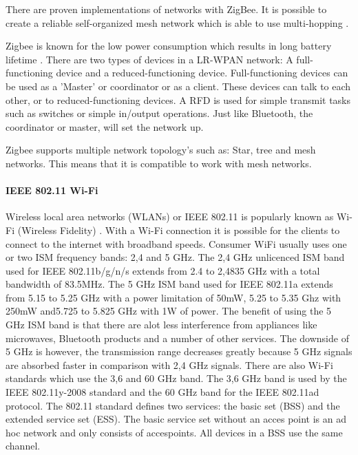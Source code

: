 \documentclass[10pt,a4paper]{article}
\begin{document}
There are proven implementations of networks with ZigBee. It is possible to create a reliable self-organized mesh network which is able to use multi-hopping \cite{comparitivestudywirelessprotocols}.

Zigbee is known for the low power consumption which results in long battery lifetime \cite{performanceevaluationlowratewirelesspan}. There are two types of devices in a LR-WPAN network: A full-functioning device and a reduced-functioning device. Full-functioning devices can be used as a 'Master' or coordinator or as a client. These devices can talk to each other, or to reduced-functioning devices. A RFD is used for simple transmit tasks such as switches or simple in/output operations. Just like Bluetooth, the coordinator or master, will set the network up.

Zigbee supports multiple network topology's such as: Star, tree and mesh networks. This means that it is compatible to work with mesh networks. \cite{zigbeewiki}


\paragraph{IEEE 802.11 Wi-Fi}
Wireless local area networks (WLANs) or IEEE 802.11 is popularly known as Wi-Fi (Wireless Fidelity) \cite{wirelessmeshnetworksopportunitiesandchallenges}. With a Wi-Fi connection it is possible for the clients to connect to the internet with broadband speeds. Consumer WiFi usually uses one or two ISM frequency bands: 2,4 and 5 GHz. The 2,4 GHz unlicenced ISM band used for IEEE 802.11b/g/n/s extends from 2.4 to 2,4835 GHz with a total bandwidth of 83.5MHz. The 5 GHz ISM band used for IEEE 802.11a extends from 5.15 to 5.25 GHz with a power limitation of 50mW, 5.25 to 5.35 Ghz with 250mW and5.725 to 5.825 GHz with 1W of power.\cite{combook} The benefit of using the 5 GHz ISM band is that there are alot less interference from appliances like microwaves, Bluetooth products and a number of other services. The downside of 5 GHz is however, the transmission range decreases greatly because 5 GHz signals are absorbed faster in comparison with 2,4 GHz signals. \cite{combook} There are also Wi-Fi standards which use the 3,6 and 60 GHz band. The 3,6 GHz band is used by the IEEE 802.11y-2008 standard and the 60 GHz band for the IEEE 802.11ad protocol. The 802.11 standard defines two services: the basic set (BSS) and the extended service set (ESS). The basic service set without an acces point is an ad hoc network and only consists of accespoints. All devices in a BSS use the same channel.\cite{Bluetoothwifisurveyandcomparison}
\end{document}
